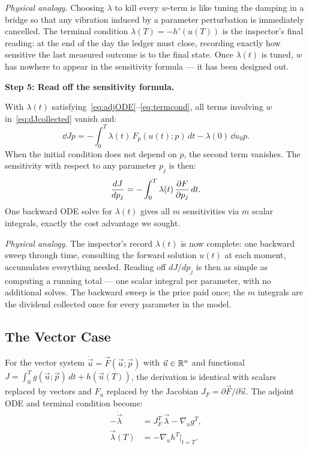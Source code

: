 \medskip\noindent\textit{Physical analogy.}
Choosing $\lambda$ to kill every $w$-term is like tuning the damping in a bridge
so that any vibration induced by a parameter perturbation is immediately cancelled.
The terminal condition $\lambda(T) = -h'(u(T))$ is the inspector's final reading:
at the end of the day the ledger must close, recording exactly how sensitive the
last measured outcome is to the final state. Once $\lambda(t)$ is tuned,
$w$ has nowhere to appear in the sensitivity formula --- it has been designed out.

\medskip
\textbf{Step 5: Read off the sensitivity formula.}

With $\lambda(t)$ satisfying~\eqref{eq:adjODE}--\eqref{eq:termcond},
all terms involving $w$ in~\eqref{eq:dJcollected} vanish and:
\begin{equation}
  \boxed{\dd{J}{p} = -\int_0^T \lambda(t)\,F_p(u(t);p)\,dt
                     - \lambda(0)\,\dd{u_0}{p}.}
  \label{eq:sensfml}
\end{equation}
When the initial condition does not depend on $p$, the second term
vanishes. The sensitivity with respect to any parameter $p_j$ is then:
\begin{equation}
  \frac{d J}{d p_j} = -\int_0^T \lambda(t)\,\frac{\partial F}{\partial p_j}\,dt.
  \label{eq:sensfml_simple}
\end{equation}
One backward ODE solve for $\lambda(t)$ gives all $m$ sensitivities
via $m$ scalar integrals, exactly the cost advantage we sought.

\medskip\noindent\textit{Physical analogy.}
The inspector's record $\lambda(t)$ is now complete: one backward sweep through
time, consulting the forward solution $u(t)$ at each moment, accumulates
everything needed. Reading off $dJ/dp_j$ is then as simple as computing a
running total --- one scalar integral per parameter, with no additional solves.
The backward sweep is the price paid once; the $m$ integrals are the
dividend collected once for every parameter in the model.

\subsection{The Vector Case}

For the vector system $\dot{\vec{u}} = \vec{F}(\vec{u}; \vec{p})$
with $\vec{u} \in \mathbb{R}^n$ and functional
$J = \int_0^T g(\vec{u};\vec{p})\,dt + h(\vec{u}(T))$,
the derivation is identical with scalars replaced by vectors
and $F_u$ replaced by the Jacobian $J_F = \partial\vec{F}/\partial\vec{u}$.
The adjoint ODE and terminal condition become:
\begin{align}
  -\dot{\vec{\lambda}} &= J_F^T\,\vec{\lambda} - \nabla_u g^T,
  \label{eq:adj_vec} \\
  \vec{\lambda}(T) &= -\nabla_u h^T\big|_{t=T}.
  \label{eq:tc_vec}
\end{align}

